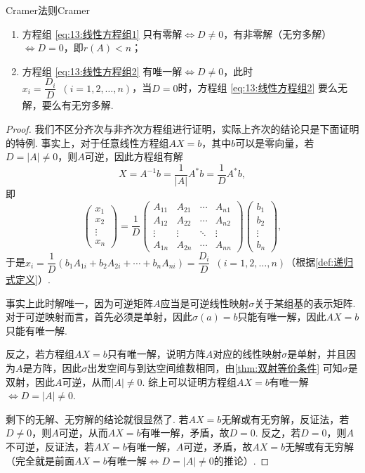 \begin{theorem}{Cramer法则}{Cramer}
    \begin{enumerate}
        \item 方程组 \ref{eq:13:线性方程组1} 只有零解$\iff D \neq 0$，有非零解（无穷多解）$\iff D=0$，即$r(A)<n$；

        \item 方程组 \ref{eq:13:线性方程组2} 有唯一解$\iff D \neq 0$，此时$x_i=\dfrac{D_i}{D}\enspace(i=1,2,\ldots,n)$，当$D=0$时，方程组 \ref{eq:13:线性方程组2} 要么无解，要么有无穷多解.
    \end{enumerate}
\end{theorem}

\begin{proof}
    我们不区分齐次与非齐次方程组进行证明，实际上齐次的结论只是下面证明的特例. 事实上，对于任意线性方程组$AX=b$，其中$b$可以是零向量，若$D=|A|\neq 0$，则$A$可逆，因此方程组有解
    \[X=A^{-1}b=\frac{1}{|A|}A^*b=\frac{1}{D}A^*b,\]
    即
    \[\begin{pmatrix}
            x_1 \\ x_2 \\ \vdots \\ x_n
        \end{pmatrix}= \dfrac{1}{D}\begin{pmatrix}
            A_{11} & A_{21} & \cdots & A_{n1} \\
            A_{12} & A_{22} & \cdots & A_{n2} \\
            \vdots & \vdots & \ddots & \vdots \\
            A_{1n} & A_{2n} & \cdots & A_{nn}
        \end{pmatrix}\begin{pmatrix}
            b_1 \\ b_2 \\ \vdots \\ b_n
        \end{pmatrix},\]
    于是$x_i=\dfrac{1}{D}(b_1A_{1i}+b_2A_{2i}+\cdots+b_nA_{ni})=\dfrac{D_i}{D}\enspace(i=1,2,\ldots,n)$（根据\autoref{def:递归式定义}）.

    事实上此时解唯一，因为可逆矩阵$A$应当是可逆线性映射$\sigma$关于某组基的表示矩阵. 对于可逆映射而言，首先必须是单射，因此$\sigma(a)=b$只能有唯一解，因此$AX=b$只能有唯一解.

    反之，若方程组$AX=b$只有唯一解，说明方阵$A$对应的线性映射$\sigma$是单射，并且因为$A$是方阵，因此$\sigma$出发空间与到达空间维数相同，由\autoref{thm:双射等价条件} 可知$\sigma$是双射，因此$A$可逆，从而$|A|\neq 0$. 综上可以证明方程组$AX=b$有唯一解$\iff D=|A|\neq 0$.

    剩下的无解、无穷解的结论就很显然了. 若$AX=b$无解或有无穷解，反证法，若$D\neq 0$，则$A$可逆，从而$AX=b$有唯一解，矛盾，故$D=0$. 反之，若$D=0$，则$A$不可逆，反证法，若$AX=b$有唯一解，$A$可逆，矛盾，故$AX=b$无解或有无穷解（完全就是前面$AX=b$有唯一解$\iff D=|A|\neq 0$的推论）.
\end{proof}

